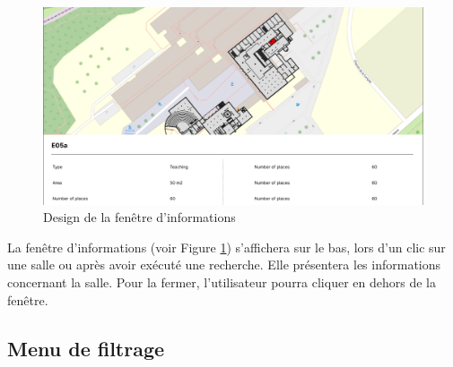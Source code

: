 \documentclass[
    iai, %
    il, %
]{heig-tb}
\begin{document}
\begin{figure}[h]
    \centering
    \includegraphics[scale=0.4]{designInfo.png}
    \caption{Design de la fenêtre d'informations}
    \label{fig:infoPanel}
\end{figure}

La fenêtre d'informations (voir Figure \ref{fig:infoPanel}) s'affichera sur le bas, lors d'un clic sur une salle ou après avoir exécuté une recherche.
Elle présentera les informations concernant la salle.
Pour la fermer, l'utilisateur pourra cliquer en dehors de la fenêtre.

\subsection{Menu de filtrage}
\end{document}
